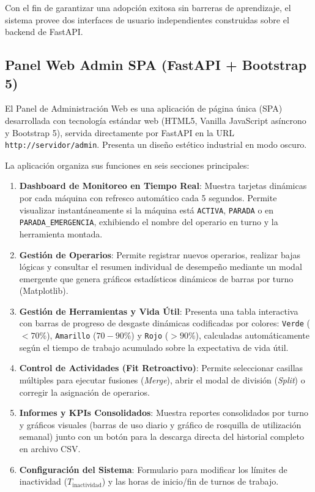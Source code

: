 \documentclass[11pt,a4paper]{article}
\begin{document}
Con el fin de garantizar una adopción exitosa sin barreras de aprendizaje, el sistema provee dos interfaces de usuario independientes construidas sobre el backend de FastAPI.

\subsection{Panel Web Admin SPA (FastAPI + Bootstrap 5)}

El Panel de Administración Web es una aplicación de página única (SPA) desarrollada con tecnología estándar web (HTML5, Vanilla JavaScript asíncrono y Bootstrap 5), servida directamente por FastAPI en la URL \texttt{http://servidor/admin}. Presenta un diseño estético industrial en modo oscuro.

La aplicación organiza sus funciones en seis secciones principales:
\begin{enumerate}
    \item \textbf{Dashboard de Monitoreo en Tiempo Real}: Muestra tarjetas dinámicas por cada máquina con refresco automático cada 5 segundos. Permite visualizar instantáneamente si la máquina está \texttt{ACTIVA}, \texttt{PARADA} o en \texttt{PARADA\_EMERGENCIA}, exhibiendo el nombre del operario en turno y la herramienta montada.
    \item \textbf{Gestión de Operarios}: Permite registrar nuevos operarios, realizar bajas lógicas y consultar el resumen individual de desempeño mediante un modal emergente que genera gráficos estadísticos dinámicos de barras por turno (Matplotlib).
    \item \textbf{Gestión de Herramientas y Vida Útil}: Presenta una tabla interactiva con barras de progreso de desgaste dinámicas codificadas por colores: \texttt{Verde} ($<70\%$), \texttt{Amarillo} ($70-90\%$) y \texttt{Rojo} ($>90\%$), calculadas automáticamente según el tiempo de trabajo acumulado sobre la expectativa de vida útil.
    \item \textbf{Control de Actividades (Fit Retroactivo)}: Permite seleccionar casillas múltiples para ejecutar fusiones (\textit{Merge}), abrir el modal de división (\textit{Split}) o corregir la asignación de operarios.
    \item \textbf{Informes y KPIs Consolidados}: Muestra reportes consolidados por turno y gráficos visuales (barras de uso diario y gráfico de rosquilla de utilización semanal) junto con un botón para la descarga directa del historial completo en archivo CSV.
    \item \textbf{Configuración del Sistema}: Formulario para modificar los límites de inactividad ($T_{\text{inactividad}}$) y las horas de inicio/fin de turnos de trabajo.
\end{enumerate}
\end{document}
